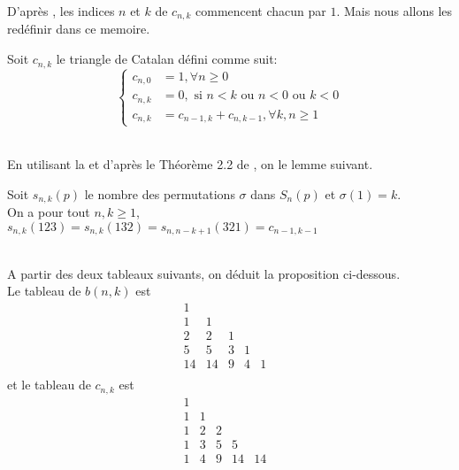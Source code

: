 D'après \cite{Desantis}, les indices $n$ et $k$ de $c_{n, k}$ commencent chacun par $1$. Mais nous allons les redéfinir dans ce memoire.\\
\begin{rm}
	\begin{definition}\label{firstDefLab}
		Soit $c_{n, k}$ le triangle de Catalan défini comme suit:
		$$
			\begin{cases}
				c_{n, 0} & = 1, \forall n\geq 0                                 \\
				c_{n, k} & = 0, \text{ si } n<k \text{ ou } n<0 \text{ ou } k<0 \\
				c_{n, k} & = c_{n-1, k} + c_{n, k-1}, \forall k, n \geq 1
			\end{cases}
		$$
	\end{definition}
\end{rm}
\text{}\vspace{10pt}\\
En utilisant la  et d'après le Théorème 2.2 de \cite{Desantis}, on le lemme suivant.
\begin{lemme}
	Soit $s_{n, k} (p)$ le nombre des permutations $\sigma$ dans $S_{n}(p)$ et $\sigma(1)=k$.\\ On a pour tout $n, k \geq 1$, $s_{n,k}(123) = s_{n,k}(132) = s_{n, n-k+1}(321) = c_{n-1, k-1}$
\end{lemme}
\text{ }\\
A partir des deux tableaux suivants, on déduit la proposition ci-dessous.\vspace{5pt}\\
Le tableau de $b(n, k)$ est
$$
	\begin{matrix}
		1  &                  \\
		1  & 1  &             \\
		2  & 2  & 1 &         \\
		5  & 5  & 3 & 1 &     \\
		14 & 14 & 9 & 4 & 1 & \\
	\end{matrix}
$$
et le tableau de $c_{n, k}$ est
$$
	\begin{matrix}
		1 &                   \\
		1 & 1 &               \\
		1 & 2 & 2 &           \\
		1 & 3 & 5 & 5  &      \\
		1 & 4 & 9 & 14 & 14 & \\
	\end{matrix}
$$
